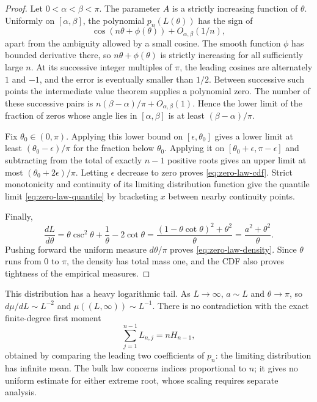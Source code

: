 \begin{proof}
Let $0<\alpha<\beta<\pi$.  The parameter $A$ is a strictly increasing
function of $\theta$.  Uniformly on $[\alpha,\beta]$, the polynomial
$p_n(L(\theta))$ has the sign of
\[
 \cos(n\theta+\phi(\theta))+O_{\alpha,\beta}(1/n),
\]
apart from the ambiguity allowed by a small cosine.  The smooth function
$\phi$ has bounded derivative there, so $n\theta+\phi(\theta)$ is
strictly increasing for all sufficiently large $n$.  At its successive
integer multiples of $\pi$, the leading cosines are alternately $1$
and $-1$, and the error is eventually smaller than $1/2$.  Between
successive such points the intermediate value theorem supplies a
polynomial zero.  The number of these successive pairs is
$n(\beta-\alpha)/\pi+O_{\alpha,\beta}(1)$.  Hence the lower limit
of the fraction of zeros whose angle lies in $[\alpha,\beta]$ is at
least $(\beta-\alpha)/\pi$.

Fix $\theta_0\in(0,\pi)$.  Applying this lower bound on
$[\epsilon,\theta_0]$ gives a lower limit at least
$(\theta_0-\epsilon)/\pi$ for the fraction below $\theta_0$.
Applying it on $[\theta_0+\epsilon,\pi-\epsilon]$ and subtracting
from the total of exactly $n-1$ positive roots gives an upper limit
at most $(\theta_0+2\epsilon)/\pi$.  Letting $\epsilon$ decrease
to zero proves \eqref{eq:zero-law-cdf}.  Strict monotonicity and
continuity of its limiting distribution function give the quantile
limit \eqref{eq:zero-law-quantile} by bracketing $x$ between nearby
continuity points.

Finally,
\[
 \frac{dL}{d\theta}
   =\theta\csc^2\theta+\frac1\theta-2\cot\theta
   =\frac{(1-\theta\cot\theta)^2+\theta^2}{\theta}
   =\frac{a^2+\theta^2}{\theta}.
\]
Pushing forward the uniform measure $d\theta/\pi$ proves
\eqref{eq:zero-law-density}.  Since $\theta$ runs from $0$ to $\pi$,
the density has total mass one, and the CDF also proves tightness of the
empirical measures.
\end{proof}

This distribution has a heavy logarithmic tail.  As $L\to\infty$,
$a\sim L$ and $\theta\to\pi$, so $d\mu/dL\sim L^{-2}$ and
$\mu((L,\infty))\sim L^{-1}$.  There is no contradiction with the
exact finite-degree first moment
\begin{equation}\label{eq:zero-law-exact-moment}
 \sum_{j=1}^{n-1}L_{n,j}=nH_{n-1},
\end{equation}
obtained by comparing the leading two coefficients of $p_n$: the
limiting distribution has infinite mean.  The bulk law concerns indices
proportional to $n$; it gives no uniform estimate for either extreme
root, whose scaling requires separate analysis.
